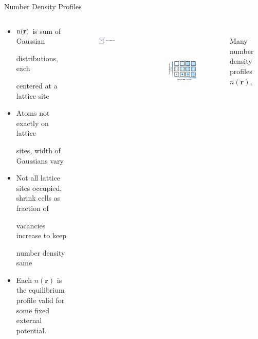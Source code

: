 \documentclass{beamer}
\renewcommand{\vec}[1]{\mathbf{#1}}
\begin{document}
\begin{frame}{Number Density Profiles}
	\begin{columns}[t]
	    \vspace{-2em}
        \begin{block}{}
            \begin{itemize}
            \item $\text n(\vec{r})$ is sum of Gaussian 
            
            distributions, each  
            
            centered at a lattice site
            \item Atoms not exactly on lattice
            
            sites, width of 
            Gaussians vary
            \item Not all lattice sites occupied,
            shrink cells as fraction of 
            
            vacancies increase to keep 
            
            number density same
            \item Each $n(\vec r)$ is the equilibrium profile
            valid for some fixed external potential. 
            
            \end{itemize}
        \end{block}
		\vspace{-2.5em}
		    \begin{figure}
               \includegraphics[height=1.5cm]{figs/Simplified_cell.pdf}
            \end{figure}
    \normalsize
             \vspace{-2em} 
    	    \begin{figure}
               \centering
               \includegraphics[height=4.5cm]{VaryWidthandVacancies.png}
            \end{figure} 
             \vspace{-0.5em} 
                \footnotesize
    $~~~~~~~~~~$Many number density profiles $n(\vec r)$, 
    

\end{columns}
\end{frame}
\end{document}
